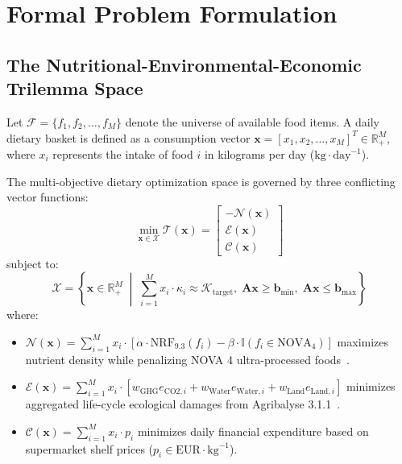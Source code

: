 \documentclass[journal,10pt,twocolumn]{article}
\begin{document}
\section{Formal Problem Formulation}

\subsection{The Nutritional-Environmental-Economic Trilemma Space}
Let $\mathcal{F} = \{f_1, f_2, \dots, f_M\}$ denote the universe of available food items. A daily dietary basket is defined as a consumption vector $\mathbf{x} = [x_1, x_2, \dots, x_M]^T \in \mathbb{R}_+^M$, where $x_i$ represents the intake of food $i$ in kilograms per day ($\text{kg}\cdot\text{day}^{-1}$).

The multi-objective dietary optimization space is governed by three conflicting vector functions:
\begin{equation}
\min_{\mathbf{x} \in \mathcal{X}} \mathcal{T}(\mathbf{x}) = \begin{bmatrix} -\mathcal{N}(\mathbf{x}) \\ \mathcal{E}(\mathbf{x}) \\ \mathcal{C}(\mathbf{x}) \end{bmatrix}
\end{equation}
subject to:
\begin{equation}
\mathcal{X} = \left\{ \mathbf{x} \in \mathbb{R}_+^M \;\middle|\; \sum_{i=1}^M x_i \cdot \kappa_i \approx \mathcal{K}_{\text{target}}, \; \mathbf{A}\mathbf{x} \ge \mathbf{b}_{\text{min}}, \; \mathbf{A}\mathbf{x} \le \mathbf{b}_{\text{max}} \right\}
\end{equation}
where:
\begin{itemize}
    \item $\mathcal{N}(\mathbf{x}) = \sum_{i=1}^M x_i \cdot \left[ \alpha \cdot \text{NRF}_{9.3}(f_i) - \beta \cdot \mathbb{I}(f_i \in \text{NOVA}_4) \right]$ maximizes nutrient density while penalizing NOVA 4 ultra-processed foods~\cite{monteiro2019ultra}.
    \item $\mathcal{E}(\mathbf{x}) = \sum_{i=1}^M x_i \cdot \left[ w_{\text{GHG}} e_{\text{CO2}, i} + w_{\text{Water}} e_{\text{Water}, i} + w_{\text{Land}} e_{\text{Land}, i} \right]$ minimizes aggregated life-cycle ecological damages from Agribalyse 3.1.1~\cite{ademe2023agribalyse}.
    \item $\mathcal{C}(\mathbf{x}) = \sum_{i=1}^M x_i \cdot p_i$ minimizes daily financial expenditure based on supermarket shelf prices ($p_i \in \text{EUR}\cdot\text{kg}^{-1}$).
\end{itemize}
\end{document}

